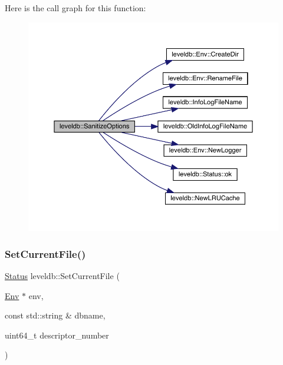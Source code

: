 Here is the call graph for this function\+:
\nopagebreak
\begin{figure}[H]
\begin{center}
\leavevmode
\includegraphics[width=350pt]{namespaceleveldb_aa4783e598841dca4393a97d360d10f56_cgraph}
\end{center}
\end{figure}
\mbox{\label{namespaceleveldb_a73133aa2e18928553d14913491b094e7}} 
\subsubsection{\texorpdfstring{SetCurrentFile()}{SetCurrentFile()}}
{\footnotesize\ttfamily \mbox{\hyperlink{classleveldb_1_1_status}{Status}} leveldb\+::\+Set\+Current\+File (\begin{DoxyParamCaption}\item[{\mbox{\hyperlink{classleveldb_1_1_env}{Env}} $\ast$}]{env,  }\item[{const std\+::string \&}]{dbname,  }\item[{uint64\+\_\+t}]{descriptor\+\_\+number }\end{DoxyParamCaption})}

